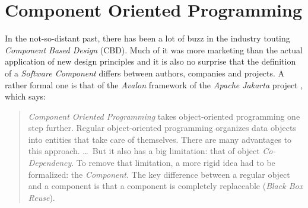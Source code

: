 %
%
%
%
%
%
%

\section{Component Oriented Programming}
\label{component_oriented_programming_heading}

In the not-so-distant past, there has been a lot of buzz in the industry
touting \emph{Component Based Design} (CBD). Much of it was more marketing than
the actual application of new design principles and it is also no surprise that
the definition of a \emph{Software Component} differs between authors, companies
and projects. A rather formal one is that of the \emph{Avalon} framework
\cite{avalon} of the \emph{Apache Jakarta} project \cite{jakarta}, which says:

\begin{quote}
    \emph{Component Oriented Programming} takes object-oriented programming one
    step further. Regular object-oriented programming organizes data objects
    into entities that take care of themselves. There are many advantages to
    this approach. \ldots\ But it also has a big limitation: that of object
    \emph{Co-Dependency}. To remove that limitation, a more rigid idea had to
    be formalized: the \emph{Component}. The key difference between a regular
    object and a component is that a component is completely replaceable
    (\emph{Black Box Reuse}).
\end{quote}

